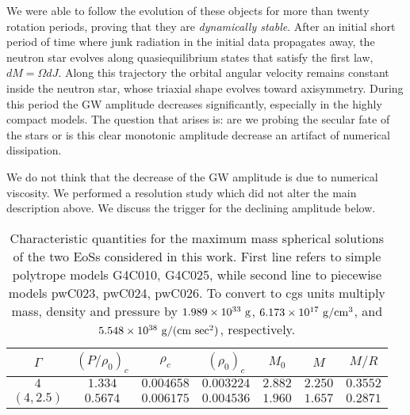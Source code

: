 \documentclass[twocolumn,superscriptaddress,showpacs,prd,aps,amsmath,amssymb,nofootinbib]{revtex4-1}
\newcommand{\GR}{\rho}
\begin{document}
We were able to follow the evolution of these objects for more than
twenty rotation periods, proving that they are \textit{dynamically
stable}. After an initial short period of time where junk radiation
in the initial data propagates away, the neutron star evolves along
quasiequilibrium states that satisfy the first law, $dM=\Omega
dJ$. Along this trajectory the orbital angular velocity remains
constant inside the neutron star, whose triaxial shape evolves toward
axisymmetry.  During this period the GW amplitude decreases
significantly, especially in the highly compact models. The question
that arises is: are we probing the secular fate of the stars or is
this clear monotonic amplitude decrease an artifact of numerical
dissipation.

We do not think that the decrease of the GW amplitude is due to
numerical viscosity. We performed a resolution study which did not
alter the main description above. We discuss the trigger for the
declining amplitude below.


\begin{table*}
\begin{tabular}{c|cccccc}
\hline
\hline
$\Gamma$   & $(P/\rho_0)_c$ & $\GR_c$ & $(\rho_0)_c$ & $M_0$ & $M$ & $M/R$  \\  
\hline
$4$        & $1.334$    & $0.004658$ & $0.003224$ & $2.882$ & $2.250$ & $0.3552$  \\  
$(4, 2.5)$ & $0.5674$   & $0.006175$ & $0.004536$ & $1.960$ & $1.657$ & $0.2871$  \\  
\hline
\hline
\end{tabular}
\caption{Characteristic quantities for the maximum mass spherical
  solutions of the two EoSs considered in this work. First line refers
  to simple polytrope models G4C010, G4C025, while second line to
  piecewise models pwC023, pwC024, pwC026. To convert to cgs units
  multiply mass, density and pressure by $1.989\times 10^{33}\ {\rm
    g}$, $6.173\times 10^{17}\ {\rm g/cm^3}$, and $5.548\times
  10^{38}\ {\rm g/(cm\ sec^2)}$, respectively.}
\label{tab:eos_param}
\end{table*}
\end{document}
